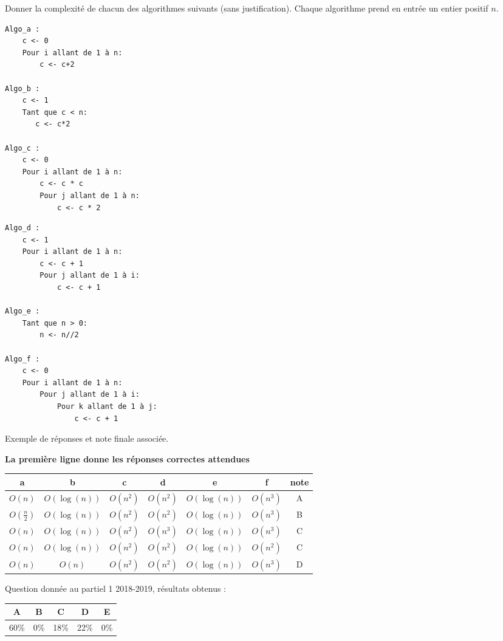 
\begin{exercice}[Partiel 2018-2019]

Donner la complexité de chacun des algorithmes suivants (sans justification). Chaque algorithme 
prend en entrée un entier positif $n$. 

\begin{minipage}[t]{0.48 \textwidth}
\begin{lstlisting}
Algo_a :
    c <- 0
    Pour i allant de 1 à n:
        c <- c+2
            
Algo_b :
    c <- 1
    Tant que c < n:
       c <- c*2   
       
Algo_c :
    c <- 0
    Pour i allant de 1 à n:
        c <- c * c
        Pour j allant de 1 à n:
	        c <- c * 2       
\end{lstlisting}
\end{minipage}
\begin{minipage}[t]{0.48 \textwidth}
\begin{lstlisting}
Algo_d :
    c <- 1
    Pour i allant de 1 à n:
        c <- c + 1
        Pour j allant de 1 à i:
            c <- c + 1

Algo_e :
    Tant que n > 0:
        n <- n//2
        
Algo_f :
    c <- 0
    Pour i allant de 1 à n:
        Pour j allant de 1 à i:
            Pour k allant de 1 à j:
                c <- c + 1
\end{lstlisting}
\end{minipage}


Exemple de réponses et note finale associée. 

\textbf{La première ligne donne les réponses correctes attendues}

\begin{tabular}{|c|c|c|c|c|c|c|}
\hline 
a & b & c & d & e & f & note \\ \hline
$O(n)$ & $O(\log(n))$ & $O(n^2)$ & $O(n^2)$ & $O(\log(n))$ & $O(n^3)$ & A \\ \hline \hline
$O(\frac{n}{2})$ & $O(\log(n))$ & $O(n^2)$ & $O(n^2)$ & $O(\log(n))$ & $O(n^3)$ & B \\ \hline
$O(n)$ & $O(\log(n))$ & $O(n^2)$ & $O(n^3)$ & $O(\log(n))$ & $O(n^3)$ & C \\ \hline
$O(n)$ & $O(\log(n))$ & $O(n^2)$ & $O(n^2)$ & $O(\log(n))$ & $O(n^2)$ & C \\ \hline
$O(n)$ & $O(n)$ & $O(n^2)$ & $O(n^2)$ & $O(\log(n))$ & $O(n^3)$ & D \\ \hline
\end{tabular}

Question donnée au partiel 1 2018-2019, résultats obtenus :

\begin{tabular}{|c|c|c|c|c|}
\hline
A & B & C & D & E \\ \hline
60\% & 0\% & 18\% & 22\% & 0\% \\ \hline
\end{tabular} 



\end{exercice}